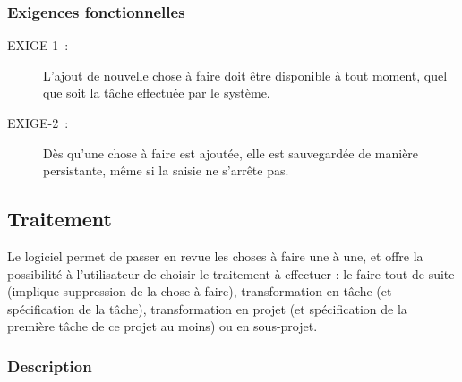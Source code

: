 	\subsubsection{Exigences fonctionnelles}


\begin{description}
 \item[EXIGE-1~:] L'ajout de nouvelle chose à faire doit être disponible à tout moment, quel que soit la tâche effectuée par le système.
 \item[EXIGE-2~:] Dès qu'une chose à faire est ajoutée, elle est sauvegardée de manière persistante, même si la saisie ne s'arrête pas.
 \end{description}






	\subsection{Traitement}

	Le logiciel permet de passer en revue les choses à faire une à une, et offre la possibilité à l'utilisateur de choisir le traitement  à effectuer : le faire tout de suite (implique suppression de la chose à faire), transformation en tâche (et spécification de la tâche), transformation en projet (et spécification de la première tâche de ce projet au moins) ou en sous-projet.


\subsubsection{Description}

